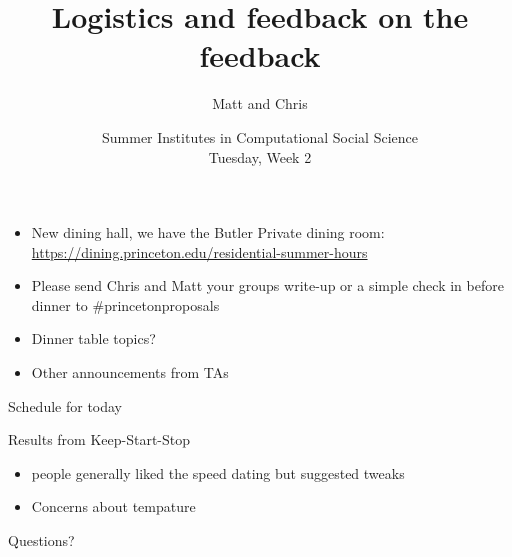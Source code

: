 \documentclass{beamer}
\title[]{Logistics and feedback on the feedback}
\author[]{Matt and Chris}
\date[]{Summer Institutes in Computational Social Science\\Tuesday, Week 2}
\begin{document}
\frame{\titlepage}
\begin{frame}

\begin{itemize}
\item New dining hall, we have the Butler Private dining room: \url{https://dining.princeton.edu/residential-summer-hours}
\pause
\item Please send Chris and Matt your groups write-up or a simple check in before dinner to \#princetonproposals
\pause
\item Dinner table topics?
\pause
\item Other announcements from TAs
\end{itemize}

\end{frame}
\begin{frame}

Schedule for today

\end{frame}
\begin{frame}

Results from Keep-Start-Stop
\begin{itemize}
\item people generally liked the speed dating but suggested tweaks
\pause
\item Concerns about tempature
\end{itemize}

\end{frame}
\begin{frame}

\begin{center}
\LARGE
Questions?
\end{center}

\end{frame}
\end{document}
